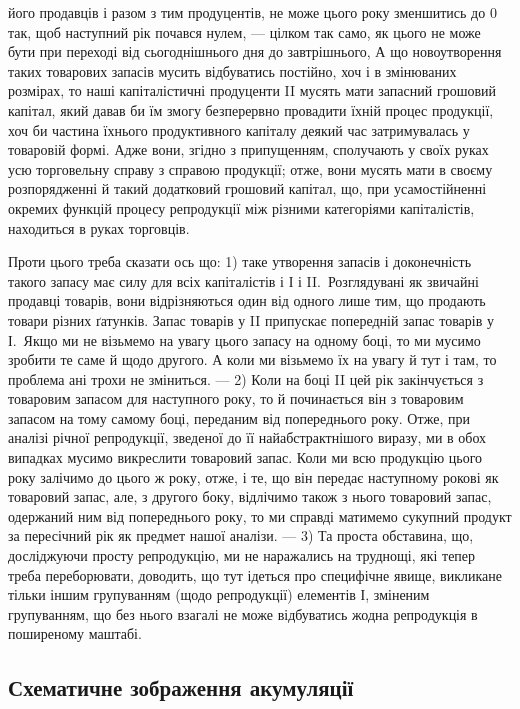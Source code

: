 \parcont{}  %
його продавців і разом з тим продуцентів, не може цього року зменшитись
до 0 так, щоб наступний рік почався нулем, — цілком так само, як
цього не може бути при переході від сьогоднішнього дня до завтрішнього,
А що новоутворення таких товарових запасів мусить відбуватись постійно,
хоч і в змінюваних розмірах, то наші капіталістичні продуценти II мусять
мати запасний грошовий капітал, який давав би їм змогу безперервно
провадити їхній процес продукції, хоч би частина їхнього продуктивного
капіталу деякий час затримувалась у товаровій формі. Адже вони, згідно
з припущенням, сполучають у своїх руках усю торговельну справу
з справою продукції; отже, вони мусять мати в своєму розпорядженні
й такий додатковий грошовий капітал, що, при усамостійненні окремих
функцій процесу репродукції між різними категоріями капіталістів, находиться
в руках торговців.

Проти цього треба сказати ось що: 1) таке утворення запасів і доконечність
такого запасу має силу для всіх капіталістів і І і II.~Розглядувані
як звичайні продавці товарів, вони відрізняються один від одного
лише тим, що продають товари різних ґатунків. Запас товарів у II припускає
попередній запас товарів у І.~Якщо ми не візьмемо на увагу
цього запасу на одному боці, то ми мусимо зробити те саме й щодо
другого. А коли ми візьмемо їх на увагу й тут і там, то проблема ані
трохи не зміниться. — 2) Коли на боці II цей рік закінчується з товаровим
запасом для наступного року, то й починається він з товаровим запасом
на тому самому боці, переданим від попереднього року.
Отже, при аналізі річної репродукції, зведеної до її найабстрактнішого виразу,
ми в обох випадках мусимо викреслити товаровий запас. Коли ми всю
продукцію цього року залічимо до цього ж року, отже, і те, що він передає
наступному рокові як товаровий запас, але, з другого боку, відлічимо
також з нього товаровий запас, одержаний ним від попереднього року,
то ми справді матимемо сукупний продукт за пересічний рік як предмет
нашої аналізи. — 3) Та проста обставина, що, досліджуючи просту
репродукцію, ми не наражались на труднощі, які тепер треба переборювати,
доводить, що тут ідеться про специфічне явище, викликане тільки
іншим групуванням (щодо репродукції) елементів І, зміненим групуванням,
що без нього взагалі не може відбуватись жодна репродукція в поширеному
маштабі.

\subsection{Схематичне зображення акумуляції}

